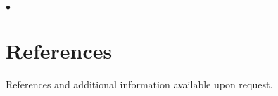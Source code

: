 \documentclass[margin,line,10pt]{res}
\newenvironment{list2}{
  \begin{list}{$\bullet$}{%
      \setlength{\itemsep}{0in}
      \setlength{\parsep}{0in} \setlength{\parskip}{0in}
      \setlength{\topsep}{0in} \setlength{\partopsep}{0in} 
      \setlength{\leftmargin}{0.2in}}}{\end{list}}
\begin{document}
\begin{resume}
\begin{list2}
\begin{itemize}
\end{itemize}
\end{list2}




\vspace{0.5cm}
\section{\sc References}
References and additional information available upon request. 

\begin{comment}
\begin{tabular}{ll}
[1] & {\bf \underline{Daniel Gianola}}, Ph.D. Sewall Wright Professor of Animal Breeding and Genetics. \\
    & Department of Animal Sciences, University of Wisconsin-Madison. \\ 
    & Address: 1675 Observatory Dr. Madison, WI 53706-1284.  \\
    & E-mail: gianola -at- ansci.wisc.edu, Phone: 608-265-2054
\end{tabular}
\end{comment}



\end{resume}
\end{document}
